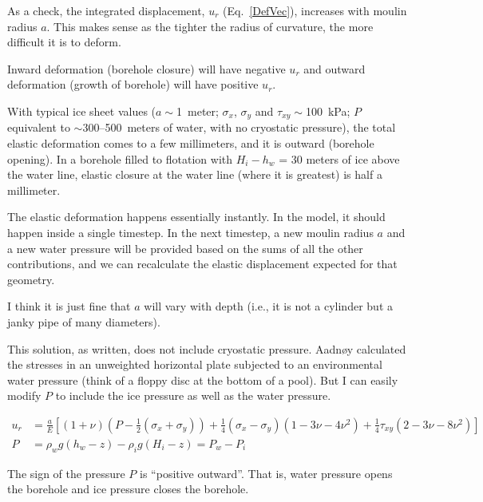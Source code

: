 \documentclass[11pt]{article}
\begin{document}
As a check, the integrated displacement, $u_r$ (Eq.~\ref{DefVec}), increases with moulin radius $a$.  This makes sense as the tighter the radius of curvature, the more difficult it is to deform.

Inward deformation (borehole closure) will have negative $u_r$ and outward deformation (growth of borehole) will have positive $u_r$.

With typical ice sheet values ($a\sim$1~meter; $\sigma_{x}$, $\sigma_y$ and $\tau_{xy}\sim$100~kPa; $P$ equivalent to $\sim$300--500~meters of water, with no cryostatic pressure), the total elastic deformation comes to a few millimeters, and it is outward (borehole opening).  In a borehole filled to flotation with $H_i-h_w$ = 30 meters of ice above the water line, elastic closure at the water line (where it is greatest) is half a millimeter.  %

The elastic deformation happens essentially instantly.  In the model, it should happen inside a single timestep.  In the next timestep, a new moulin radius $a$ and a new water pressure will be provided based on the sums of all the other contributions, and we can recalculate the elastic displacement expected for that geometry.

I think it is just fine that $a$ will vary with depth (i.e., it is not a cylinder but a janky pipe of many diameters).

This solution, as written, does not include cryostatic pressure.   Aadn\o{}y calculated the stresses in an unweighted horizontal plate subjected to an environmental water pressure (think of a floppy disc at the bottom of a pool).  But I can easily modify $P$ to include the ice pressure as well as the water pressure.


\begin{equation}
	\begin{aligned}
	u_r &=  \frac{a}{E} \left[ ( 1 + \nu ) \left( P - \frac{1}{2} (\sigma_x + \sigma_y) \right) + \frac{1}{4} (\sigma_x - \sigma_y) (1 - 3 \nu - 4 \nu^2) +   \frac{1}{4} \tau_{xy} (2 - 3 \nu - 8 \nu^2)\right] \\
	P & = \rho_w g (h_w-z) - \rho_i g (H_i-z) = P_w - P_i
	\end{aligned}
\label{DeformationIceWaterPressures}
\end{equation}

\noindent The sign of the pressure $P$ is ``positive outward''.  That is, water pressure opens the borehole and ice pressure closes the borehole.
\end{document}

